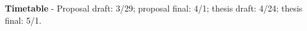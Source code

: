 \documentclass[12pt]{cmuthesis}
\begin{document}
\noindent
\textbf{Timetable} - Proposal draft: 3/29; proposal final: 4/1; thesis draft: 4/24; thesis final: 5/1.

%

\backmatter


\renewcommand{\bibsection}{\chapter{\bibname}}

\end{document}
